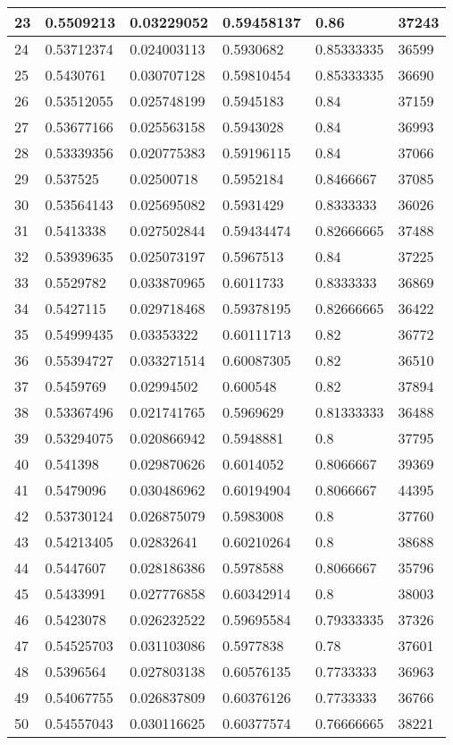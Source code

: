 \begin{longtable}{|l|l|l|l|l|l|}
23 & 0.5509213 & 0.03229052 & 0.59458137 & 0.86 & 37243 \\ \hline 
24 & 0.53712374 & 0.024003113 & 0.5930682 & 0.85333335 & 36599 \\ \hline 
25 & 0.5430761 & 0.030707128 & 0.59810454 & 0.85333335 & 36690 \\ \hline 
26 & 0.53512055 & 0.025748199 & 0.5945183 & 0.84 & 37159 \\ \hline 
27 & 0.53677166 & 0.025563158 & 0.5943028 & 0.84 & 36993 \\ \hline 
28 & 0.53339356 & 0.020775383 & 0.59196115 & 0.84 & 37066 \\ \hline 
29 & 0.537525 & 0.02500718 & 0.5952184 & 0.8466667 & 37085 \\ \hline 
30 & 0.53564143 & 0.025695082 & 0.5931429 & 0.8333333 & 36026 \\ \hline 
31 & 0.5413338 & 0.027502844 & 0.59434474 & 0.82666665 & 37488 \\ \hline 
32 & 0.53939635 & 0.025073197 & 0.5967513 & 0.84 & 37225 \\ \hline 
33 & 0.5529782 & 0.033870965 & 0.6011733 & 0.8333333 & 36869 \\ \hline 
34 & 0.5427115 & 0.029718468 & 0.59378195 & 0.82666665 & 36422 \\ \hline 
35 & 0.54999435 & 0.03353322 & 0.60111713 & 0.82 & 36772 \\ \hline 
36 & 0.55394727 & 0.033271514 & 0.60087305 & 0.82 & 36510 \\ \hline 
37 & 0.5459769 & 0.02994502 & 0.600548 & 0.82 & 37894 \\ \hline 
38 & 0.53367496 & 0.021741765 & 0.5969629 & 0.81333333 & 36488 \\ \hline 
39 & 0.53294075 & 0.020866942 & 0.5948881 & 0.8 & 37795 \\ \hline 
40 & 0.541398 & 0.029870626 & 0.6014052 & 0.8066667 & 39369 \\ \hline 
41 & 0.5479096 & 0.030486962 & 0.60194904 & 0.8066667 & 44395 \\ \hline 
42 & 0.53730124 & 0.026875079 & 0.5983008 & 0.8 & 37760 \\ \hline 
43 & 0.54213405 & 0.02832641 & 0.60210264 & 0.8 & 38688 \\ \hline 
44 & 0.5447607 & 0.028186386 & 0.5978588 & 0.8066667 & 35796 \\ \hline 
45 & 0.5433991 & 0.027776858 & 0.60342914 & 0.8 & 38003 \\ \hline 
46 & 0.5423078 & 0.026232522 & 0.59695584 & 0.79333335 & 37326 \\ \hline 
47 & 0.54525703 & 0.031103086 & 0.5977838 & 0.78 & 37601 \\ \hline 
48 & 0.5396564 & 0.027803138 & 0.60576135 & 0.7733333 & 36963 \\ \hline 
49 & 0.54067755 & 0.026837809 & 0.60376126 & 0.7733333 & 36766 \\ \hline 
50 & 0.54557043 & 0.030116625 & 0.60377574 & 0.76666665 & 38221 \\ \hline 
\end{longtable}